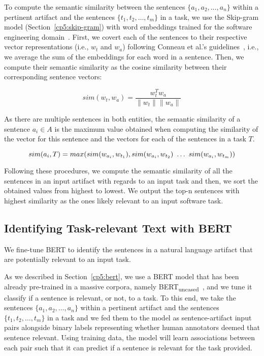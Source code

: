 To compute the semantic similarity between the sentences $\{a_1, a_2, \dots, a_n\}$ within a pertinent artifact and the sentences $\{t_1, t_2, \dots, t_m\}$ in a task, 
we use the Skip-gram model (Section~\ref{cp5:skip-gram}) with word embeddings trained for the software engineering domain~\cite{Efstathiou2018}. 
First, we covert each of the sentences to their respective vector representations (i.e., $w_t$ and $w_a$) following Conneau et al.'s guidelines~\cite{conneau2018}, i.e., we average the sum of the embeddings for each word in a sentence.
Then, we compute their semantic similarity as the cosine similarity  between their corresponding sentence vectors:


\begin{equation}
    sim(w_t,w_a) = \frac{w_t^Tw_a}{\|w_t\| \|w_a\|}
    \label{eq:word-sim}
\end{equation}
 
\smallskip
 As there are multiple sentences in both entities, the semantic similarity of a sentence $a_i \in A$ is the maximum value obtained when computing the similarity of the vector for this sentence and the vectors for each of the sentences in a task $T$.

 \begin{equation}
    sim(a_i, T) = max(sim(w_{a_i}, w_{t_1}), sim(w_{a_i}, w_{t_2}) ~\dots~ sim(w_{a_i}, w_{t_m})) \\
\end{equation}

\smallskip
Following these procedures, we compute the semantic similarity of all the sentences in an input artifact with regards to an input task and then, 
we sort the obtained values from highest to lowest. We output the top-n sentences with highest similarity as the ones likely relevant to an input software task.


\subsection{Identifying Task-relevant Text with BERT}
\label{cp5:approach-bert}



We fine-tune BERT to identify the sentences in a natural language artifact that are potentially relevant to an input task.



As we described in Section~\ref{cp5:bert}, we use a BERT model that has been already pre-trained in a massive corpora, namely BERT\textsubscript{uncased}~\cite{Devlin2018Bert}, and we tune it classify if a sentence is relevant, or not, to a task.
To this end, we take the sentences $\{a_1, a_2, \dots, a_n\}$ within a pertinent artifact and the sentences $\{t_1, t_2, \dots, t_m\}$ in a task and we fed them to the model as sentence-artifact input pairs 
alongside binary labels representing whether human annotators deemed that sentence relevant. 
Using training data, the model will learn associations between each pair such that it can predict if a sentence is relevant for the task provided. 

